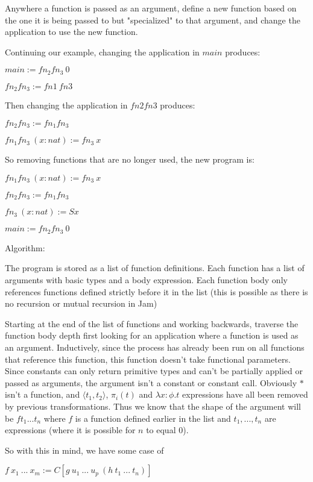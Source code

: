 \documentclass[12pt,a4paper,titlepage]{article}
\begin{document}
    Anywhere a function is passed as an argument, define a new function based on the one it is being passed
    to but "specialized" to that argument, and change the application to use the new function.

    Continuing our example, changing the application in $main$ produces:

    $main := fn_2 fn_3\ 0$

    $fn_2 fn_3 := fn1\ fn3$

    Then changing the application in $fn2fn3$ produces:

    $fn_2 fn_3 := fn_1 fn_3$

    $fn_1 fn_3\ (x: nat) := fn_3\ x$

    So removing functions that are no longer used, the new program is:

    $fn_1 fn_3\ (x: nat) := fn_3\ x$

    $fn_2 fn_3 := fn_1 fn_3$

    $fn_3\ (x: nat) := S x$

    $main := fn_2 fn_3\ 0$

    Algorithm:

    The program is stored as a list of function definitions.
    Each function has a list of arguments with basic types and a body expression.
    Each function body only references functions defined strictly before it in the list (this is
    possible as there is no recursion or mutual recursion in Jam)

    Starting at the end of the list of functions and working backwards, traverse the function body depth first
    looking for an application where a function is used as an argument.
    Inductively, since the process has already been run on all functions that reference this function, this
    function doesn't take functional parameters.
    Since constants can only return primitive types and can't be partially applied or passed as arguments,
    the argument isn't a constant or constant call. Obviously $\ast$ isn't a function, and $\langle t_1, t_2 \rangle$,
    $\pi_i (t)$ and $\lambda x: \phi . t$ expressions have all been removed by previous transformations.
    Thus we know that the shape of the argument will be $f t_1 ... t_n$ where $f$ is a function defined earlier
    in the list and $t_1, ..., t_n$ are expressions (where it is possible for $n$ to equal 0).

    So with this in mind, we have some case of

    $f\ x_1\ ...\ x_m := C[g\ u_1\ ...\ u_p\ (h\ t_1\ ...\ t_n)]$
\end{document}
